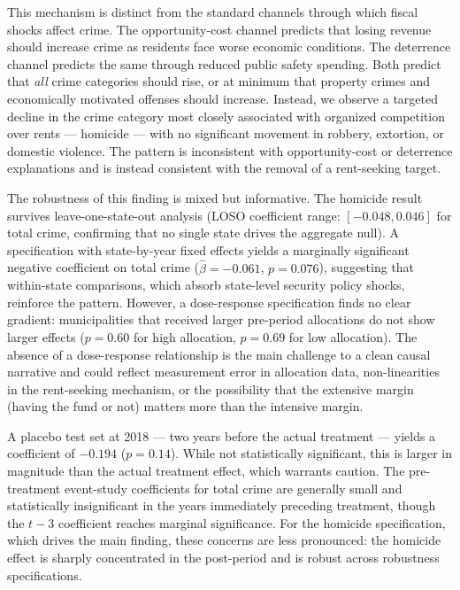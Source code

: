 \documentclass[12pt]{article}
\begin{document}
This mechanism is distinct from the standard channels through which fiscal shocks affect crime. The opportunity-cost channel \citep{dix2017demand} predicts that losing revenue should increase crime as residents face worse economic conditions. The deterrence channel \citep{chalfin2022more} predicts the same through reduced public safety spending. Both predict that \textit{all} crime categories should rise, or at minimum that property crimes and economically motivated offenses should increase. Instead, we observe a targeted decline in the crime category most closely associated with organized competition over rents --- homicide --- with no significant movement in robbery, extortion, or domestic violence. The pattern is inconsistent with opportunity-cost or deterrence explanations and is instead consistent with the removal of a rent-seeking target.

The robustness of this finding is mixed but informative. The homicide result survives leave-one-state-out analysis (LOSO coefficient range: $[-0.048, 0.046]$ for total crime, confirming that no single state drives the aggregate null). A specification with state-by-year fixed effects yields a marginally significant negative coefficient on total crime ($\hat{\beta} = -0.061$, $p = 0.076$), suggesting that within-state comparisons, which absorb state-level security policy shocks, reinforce the pattern. However, a dose-response specification finds no clear gradient: municipalities that received larger pre-period allocations do not show larger effects ($p = 0.60$ for high allocation, $p = 0.69$ for low allocation). The absence of a dose-response relationship is the main challenge to a clean causal narrative and could reflect measurement error in allocation data, non-linearities in the rent-seeking mechanism, or the possibility that the extensive margin (having the fund or not) matters more than the intensive margin.

A placebo test set at 2018 --- two years before the actual treatment --- yields a coefficient of $-0.194$ ($p = 0.14$). While not statistically significant, this is larger in magnitude than the actual treatment effect, which warrants caution. The pre-treatment event-study coefficients for total crime are generally small and statistically insignificant in the years immediately preceding treatment, though the $t-3$ coefficient reaches marginal significance. For the homicide specification, which drives the main finding, these concerns are less pronounced: the homicide effect is sharply concentrated in the post-period and is robust across robustness specifications.
\end{document}
